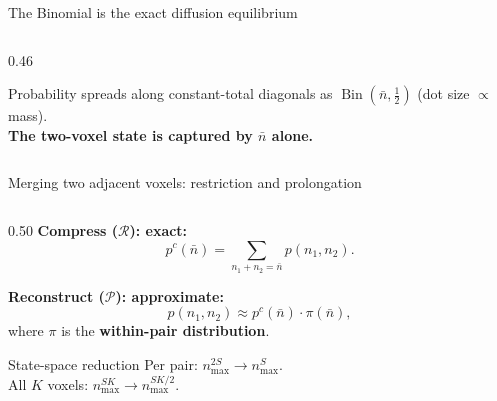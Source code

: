 \documentclass[10pt,aspectratio=169]{beamer}
\newcommand{\Bin}{\operatorname{Bin}}
\newcommand{\calR}{\mathcal{R}}
\newcommand{\calP}{\mathcal{P}}
\begin{document}
\begin{frame}{The Binomial is the exact diffusion equilibrium}
\begin{columns}[T]
\begin{column}{0.46\textwidth}
\begin{center}
      \vspace{0.4em}
      {\footnotesize
        Probability spreads along constant-total diagonals
        as $\Bin(\bar n,\tfrac12)$ (dot size $\propto$ mass).\\[0.3em]
        \textbf{The two-voxel state is captured by $\bar n$ alone.}
      }
      \end{center}
    \end{column}
  \end{columns}

\end{frame}


\begin{frame}{Merging two adjacent voxels: restriction and prolongation}

  \begin{columns}[T]
    \begin{column}{0.50\textwidth}
      \textbf{Compress ($\calR$): exact:}
      \[ p^c(\bar n) = \!\!\sum_{n_1 + n_2 = \bar n}\!\! p(n_1, n_2). \]

      \textbf{Reconstruct ($\calP$): approximate:}
      \[ p(n_1, n_2) \approx p^c(\bar n)\cdot\pi(\bar n), \]
      where $\pi$ is the \textbf{within-pair distribution}.

      \begin{block}{State-space reduction}
        Per pair: $n_{\max}^{2S} \to n_{\max}^{S}$.\\
        All $K$ voxels: $n_{\max}^{SK} \to n_{\max}^{SK/2}$.
      \end{block}


\end{column}
\end{columns}
\end{frame}
\end{document}
